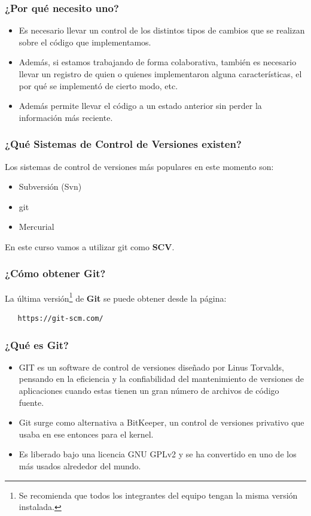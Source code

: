 \documentclass{beamer}
\begin{document}
\begin{frame}
  \frametitle{¿Por qué necesito uno?}
  \begin{itemize}[<+->]
  \item Es necesario llevar un control de los distintos tipos de
    cambios que se realizan sobre el código que implementamos.
  \item Además, si estamos trabajando de forma colaborativa, también
    es necesario llevar un registro de quien o quienes implementaron
    alguna características, el por qué se implementó de cierto modo, etc.
  \item Además permite llevar el código a un estado anterior sin
    perder la información más reciente.
  \end{itemize}
\end{frame}

\begin{frame}
  \frametitle{¿Qué Sistemas de Control de Versiones existen?}
  Los sistemas de control de versiones más populares en este momento
  son:
  \begin{itemize}
    \item Subversión (Svn)
    \item git
    \item Mercurial
  \end{itemize}
  En este curso vamos a utilizar git como \textbf{SCV}.
\end{frame}

\begin{frame}[fragile]
  \frametitle{¿Cómo obtener Git?}
  La última versión\footnote[frame]{Se recomienda que todos los
    integrantes del equipo tengan la misma versión instalada.} de
  \textbf{Git} se puede obtener desde la página:
  \begin{verbatim}
   https://git-scm.com/
  \end{verbatim}
\end{frame}

\begin{frame}
  \frametitle{¿Qué es Git?}
  \begin{itemize}[<+->]
    \item GIT es un software de control de versiones diseñado por
      Linus Torvalds, pensando en la eficiencia y la confiabilidad del
      mantenimiento de versiones de aplicaciones cuando estas tienen un gran
      número de archivos de código fuente.
    \item Git surge como alternativa a BitKeeper, un control de
      versiones privativo que usaba en ese entonces para el kernel.
    \item Es liberado bajo una licencia GNU GPLv2 y se ha convertido
      en uno de los más usados alrededor del mundo.
  \end{itemize}
\end{frame}
\end{document}
